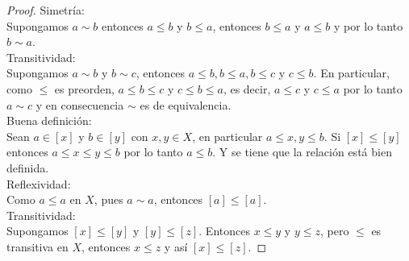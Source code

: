 \documentclass{article}
\begin{document}
\begin{enumerate}[label=\textbf{Ej \arabic*.}]
\begin{proof}
Simetría:\\
Supongamos $a\sim b$ entonces $a\leq b$ y $b\leq a$, entonces $b\leq a$ y $a\leq b$ y por lo tanto $b\sim a$.\\

Transitividad:\\
Supongamos $a\sim b$ y $b\sim c$, entonces $a\leq b, b\leq a, b\leq c$ y $c\leq b$. En particular, como $\leq$ es preorden, $a\leq b\leq c$ y 
$c\leq b\leq a$, es decir, $a\leq c$ y $c\leq a$ por lo tanto $a\sim c$ y en consecuencia $\sim$ es de equivalencia.\\

 Buena definición:\\
Sean $a\in [x]$ y $b\in [y]$ con $x,y\in X$, en particular $a\leq x, y\leq b$. Si $[x]\leq [y]$ entonces 
$a\leq x\leq y\leq b$ por lo tanto $a\leq b$. Y se tiene que la relación está
bien definida.\\

Reflexividad:\\
Como $a\leq a$ en $X$, pues $a\sim a$, entonces $[a]\leq [a]$.\\

Transitividad:\\
Supongamos $[x]\leq [y]$ y $[y]\leq [z]$. Entonces $x\leq y$ y $y\leq z$, pero $\leq$ es transitiva en $X$, entonces $x\leq z$ y así $[x]\leq [z]$.
\end{proof}
 

\end{enumerate}
\end{document}
